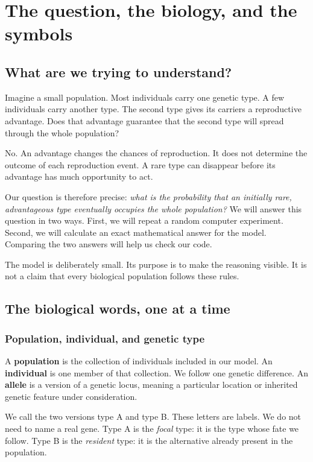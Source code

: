 \chapter{The question, the biology, and the symbols}
\label{chap:foundations}

\section{What are we trying to understand?}

Imagine a small population. Most individuals carry one genetic type. A few
individuals carry another type. The second type gives its carriers a
reproductive advantage. Does that advantage guarantee that the second type
will spread through the whole population?

No. An advantage changes the chances of reproduction. It does not determine
the outcome of each reproduction event. A rare type can disappear before its
advantage has much opportunity to act.

Our question is therefore precise: \emph{what is the probability that an
initially rare, advantageous type eventually occupies the whole population?}
We will answer this question in two ways. First, we will repeat a random
computer experiment. Second, we will calculate an exact mathematical answer
for the model. Comparing the two answers will help us check our code.

The model is deliberately small. Its purpose is to make the reasoning visible.
It is not a claim that every biological population follows these rules.

\section{The biological words, one at a time}

\subsection{Population, individual, and genetic type}

A \textbf{population} is the collection of individuals included in our model.
An \textbf{individual} is one member of that collection. We follow one genetic
difference. An \textbf{allele} is a version of a genetic locus, meaning a
particular location or inherited genetic feature under consideration.

We call the two versions type A and type B. These letters are labels. We do
not need to name a real gene. Type A is the \emph{focal} type: it is the type
whose fate we follow. Type B is the \emph{resident} type: it is the alternative
already present in the population.

